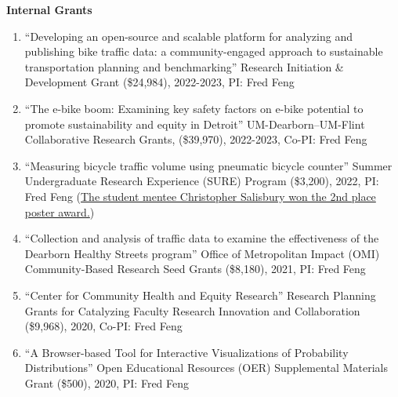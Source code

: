 \documentclass[11pt]{article}
\newenvironment{main}
{\begin{adjustwidth}{3em}{}}
{\end{adjustwidth}}
\begin{document}
\begin{main}
\begin{enumerate}
    \end{enumerate}

\textbf{Internal Grants}
\begin{enumerate}
    \item ``Developing an open-source and scalable platform for analyzing and publishing bike traffic data: a community-engaged approach to sustainable transportation planning and benchmarking''
            Research Initiation \& Development Grant (\$24,984), 2022-2023, PI: Fred Feng
    \item ``The e-bike boom: Examining key safety factors on e-bike potential to promote sustainability and equity in Detroit''
            UM-Dearborn–UM-Flint Collaborative Research Grants, (\$39,970), 2022-2023, Co-PI: Fred Feng
    \item ``Measuring bicycle traffic volume using pneumatic bicycle counter''
           Summer Undergraduate Research Experience (SURE) Program (\$3,200), 2022, PI: Fred Feng 
           (\href{https://umdearborn.edu/academics/undergraduate-studies/undergraduate-research/sure-program}{The student mentee Christopher Salisbury won the 2nd place poster award.})
    \item ``Collection and analysis of traffic data to examine the effectiveness of the Dearborn Healthy Streets program''
          Office of Metropolitan Impact (OMI) Community-Based Research Seed Grants (\$8,180), 2021, PI: Fred Feng
    \item ``Center for Community Health and Equity Research'' 
         Research Planning Grants for Catalyzing Faculty Research Innovation and Collaboration (\$9,968), 2020, Co-PI: Fred Feng
    \item ``A Browser-based Tool for Interactive Visualizations of Probability Distributions''
        Open Educational Resources (OER) Supplemental Materials Grant (\$500), 2020, PI: Fred Feng
\end{enumerate}





\end{main}
\end{document}
